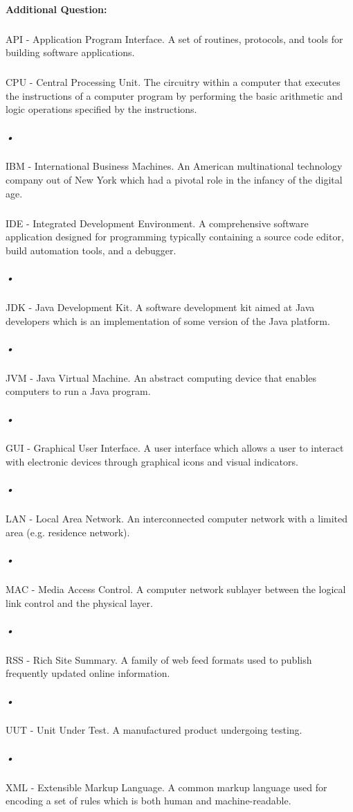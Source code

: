 \documentclass[10pt]{article}
\begin{document}
\paragraph{Additional Question: }
\subparagraph{}API - Application Program Interface. A set of routines, protocols, and tools for building software applications. 
\subparagraph{}CPU - Central Processing Unit. The circuitry within a computer that executes the instructions of a computer program by performing the basic arithmetic and logic operations specified by the instructions. 
\subparagraph{•}IBM - International Business Machines. An American multinational technology company out of New York which had a pivotal role in the infancy of the digital age. 
\subparagraph{}IDE - Integrated Development Environment. A comprehensive software application designed for programming typically containing a source code editor, build automation tools, and a debugger. 
\subparagraph{•}JDK - Java Development Kit. A software development kit aimed at Java developers which is an implementation of some version of the Java platform. 
\subparagraph{•}JVM - Java Virtual Machine. An abstract computing device that enables computers to run a Java program. 
\subparagraph{•}GUI - Graphical User Interface. A user interface which allows a user to interact with electronic devices through graphical icons and visual indicators. 
\subparagraph{•}LAN - Local Area Network. An interconnected computer network with a limited area (e.g. residence network). 
\subparagraph{•}MAC - Media Access Control. A computer network sublayer between the logical link control and the physical layer. 
\subparagraph{•}RSS - Rich Site Summary. A family of web feed formats used to publish frequently updated online information. 
\subparagraph{•}UUT - Unit Under Test. A manufactured product undergoing testing. 
\subparagraph{•}XML - Extensible Markup Language. A common markup language used for encoding a set of rules which is both human and machine-readable. 
\end{document}
